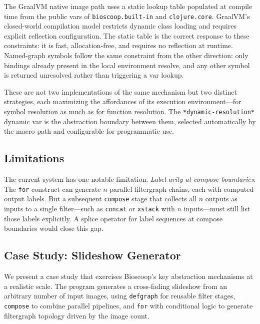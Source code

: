 \documentclass[english,submission]{programming}
\begin{document}
The GraalVM native image path uses a static lookup table populated at compile time from the public vars of \texttt{bioscoop.built-in} and \texttt{clojure.core}. GraalVM's closed-world compilation model restricts dynamic class loading and requires explicit reflection configuration. The static table is the correct response to these constraints: it is fast, allocation-free, and requires no reflection at runtime. Named-graph symbols follow the same constraint from the other direction: only bindings already present in the local environment resolve, and any other symbol is returned unresolved rather than triggering a var lookup.

These are not two implementations of the same mechanism but two distinct strategies, each maximizing the affordances of its execution environment---for symbol resolution as much as for function resolution.  The \texttt{*dynamic-resolution*} dynamic var is the abstraction boundary between them, selected automatically by the macro path and configurable for programmatic use.

\subsection{Limitations}\label{sec:limitations}

The current system has one notable limitation. \emph{Label arity at compose boundaries}: The \texttt{for} construct can generate $n$ parallel filtergraph chains, each with computed output labels. But a subsequent \texttt{compose} stage that collects all $n$ outputs as inputs to a single filter---such as \texttt{concat} or \texttt{xstack} with $n$ inputs---must still list those labels explicitly. A splice operator for label sequences at compose boundaries would close this gap.

\subsection{Case Study: Slideshow Generator}\label{sec:slideshow}

We present a case study that exercises Bioscoop's key abstraction mechanisms at a realistic scale. The program generates a cross-fading slideshow from an arbitrary number of input images, using \texttt{defgraph} for reusable filter stages, \texttt{compose} to combine parallel pipelines, and \texttt{for} with conditional logic to generate filtergraph topology driven by the image count.
\end{document}
